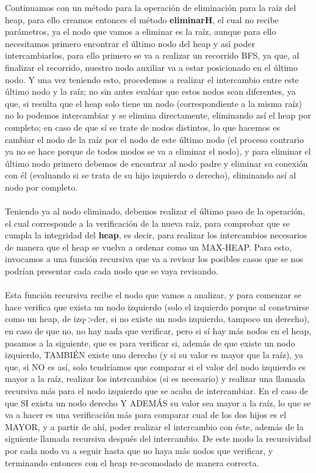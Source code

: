 \documentclass{report}
\begin{document}
Continuamos con un método para la operación de eliminación para la raíz del heap, para ello creamos entonces el método \textbf{eliminarH}, el cual no recibe parámetros, ya el nodo que vamos a eliminar es la raíz, aunque para ello necesitamos primero encontrar el último nodo del heap y así poder intercambiarlos, para ello primero se va a realizar un recorrido BFS, ya que, al finalizar el recorrido, nuestro nodo auxiliar va a estar posicionado en el último nodo. Y una vez teniendo esto, procedemos a realizar el intercambio entre este último nodo y la raíz; no sin antes evalúar que estos nodos sean diferentes, ya que, si resulta que el heap solo tiene un nodo (correspondiente a la misma raíz) no lo podemos intercambiar y se elimina directamente, eliminando así el heap por completo; en caso de que sí se trate de nodos distintos, lo que hacemos es cambiar el nodo de la raíz por el nodo de este último nodo (el proceso contrario ya no se hace porque de todos modos se va a eliminar el nodo), y para eliminar el último nodo primero debemos de encontrar al nodo padre y eliminar su conexión con él (evaluando si se trata de su hijo izquierdo o derecho), eliminando así al nodo por completo.\\\\
Teniendo ya al nodo eliminado, debemos realizar el último paso de la operación, el cual corresponde a la verificación de la nueva raíz, para comprobar que se cumpla la integridad del \textbf{heap}, es decir, para realizar los intercambios necesarios de manera que el heap se vuelva a ordenar como un MAX-HEAP. Para esto, invocamos a una función recursiva que va a revisar los posibles casos que se nos podrían presentar cada cada nodo que se vaya revisando.\\\\
Esta función recursiva recibe el nodo que vamos a analizar, y para comenzar se hace verifica que exista un nodo izquierdo (solo el izquierdo porque al construirse como un heap, de izq->der, si no existe un nodo izquierdo, tampoco un derecho), en caso de que no, no hay nada que verificar, pero si sí hay más nodos en el heap, pasamos a la siguiente, que es para verificar si, además de que existe un nodo izquierdo, TAMBIÉN existe uno derecho (y si su valor es mayor que la raíz), ya que, si NO es así, solo tendríamos que comparar si el valor del nodo izquierdo es mayor a la raíz, realizar los intercambios (si es necesario) y realizar una llamada recursiva más para el nodo izquierdo que se acaba de intercambiar. En el caso de que SI exista un nodo derecho Y ADEMÁS su valor sea mayor a la raíz, lo que se va a hacer es una verificación más para comparar cual de los dos hijos es el MAYOR, y a partir de ahí, poder realizar el intercambio con éste, además de la siguiente llamada recursiva después del intercambio. De este modo la recursividad por cada nodo va a seguir hasta que no haya más nodos que verificar, y terminando entonces con el heap re-acomodado de manera correcta.\\
\end{document}
